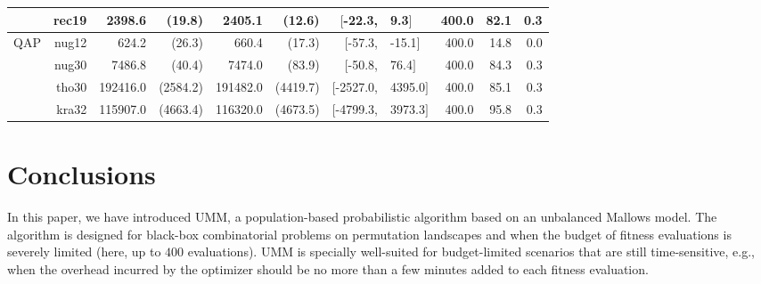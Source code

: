 \documentclass[runningheads]{llncs}
\begin{document}
\begin{table}[tb]
{\begin{tabular}{r@{\hskip -2ex}*{5}{r}rl@{\hskip -2ex}*{3}{r}}
       & rec19        & 2398.6                  & (19.8)     & 2405.1    & (12.6)                 & $[$-22.3,     & 9.3$]$        & 400.0& 82.1 & 0.3  \\\midrule
    QAP  & nug12        & 624.2                   & (26.3)     & 660.4     & (17.3)                 & $[$-57.3,     & -15.1$]$      & 400.0& 14.8 & 0.0  \\
         & nug30        & 7486.8                  & (40.4)     & 7474.0    & (83.9)                 & $[$-50.8,     & 76.4$]$       & 400.0& 84.3 & 0.3  \\
        & tho30        & 192416.0                & (2584.2)   & 191482.0  & (4419.7)               & $[$-2527.0,   & 4395.0$]$     & 400.0& 85.1 & 0.3  \\
         & kra32        & 115907.0                & (4663.4)   & 116320.0  & (4673.5)               & $[$-4799.3,   & 3973.3$]$     & 400.0& 95.8 & 0.3  \\
\bottomrule
\end{tabular}}
\end{table}




\section{Conclusions}\label{sec:conclusions}

In this paper, we have introduced UMM, a population-based probabilistic
algorithm based on an unbalanced Mallows model. The algorithm is designed for
black-box combinatorial problems on permutation landscapes and when the budget
of fitness evaluations is severely limited (here, up to $400$ evaluations).
UMM  is specially well-suited for budget-limited
scenarios that are still time-sensitive, e.g., when the overhead incurred by
the optimizer should be no more than a few minutes added to each fitness
evaluation. 
\end{document}
